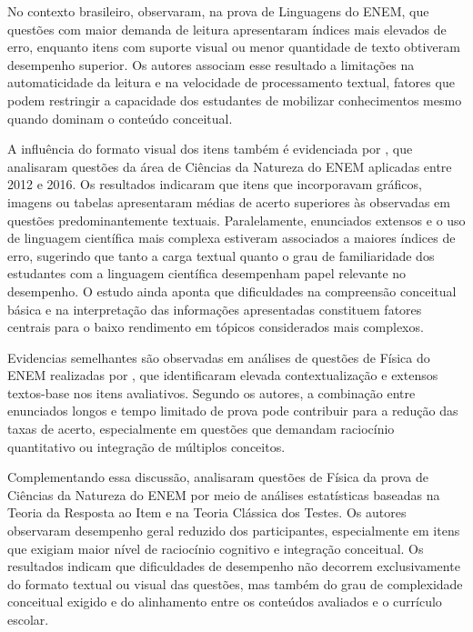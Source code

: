 \documentclass[a4paper,10pt, twocolumn]{article}
\begin{document}
No contexto brasileiro, \textcite{silva2019desempenho} observaram, na prova de Linguagens do ENEM, que questões com maior demanda de leitura apresentaram índices mais elevados de erro, enquanto itens com suporte visual ou menor quantidade de texto obtiveram desempenho superior. Os autores associam esse resultado a limitações na automaticidade da leitura e na velocidade de processamento textual, fatores que podem restringir a capacidade dos estudantes de mobilizar conhecimentos mesmo quando dominam o conteúdo conceitual.

A influência do formato visual dos itens também é evidenciada por \textcite{Cestaro2020}, que analisaram questões da área de Ciências da Natureza do ENEM aplicadas entre 2012 e 2016. Os resultados indicaram que itens que incorporavam gráficos, imagens ou tabelas apresentaram médias de acerto superiores às observadas em questões predominantemente textuais. Paralelamente, enunciados extensos e o uso de linguagem científica mais complexa estiveram associados a maiores índices de erro, sugerindo que tanto a carga textual quanto o grau de familiaridade dos estudantes com a linguagem científica desempenham papel relevante no desempenho. O estudo ainda aponta que dificuldades na compreensão conceitual básica e na interpretação das informações apresentadas constituem fatores centrais para o baixo rendimento em tópicos considerados mais complexos.

Evidencias semelhantes são observadas em análises de questões de Física do ENEM realizadas por \textcite{goncalves2014questoes}, que identificaram elevada contextualização e extensos textos-base nos itens avaliativos. Segundo os autores, a combinação entre enunciados longos e tempo limitado de prova pode contribuir para a redução das taxas de acerto, especialmente em questões que demandam raciocínio quantitativo ou integração de múltiplos conceitos.

Complementando essa discussão, \textcite{lopes2015estudo} analisaram questões de Física da prova de Ciências da Natureza do ENEM por meio de análises estatísticas baseadas na Teoria da Resposta ao Item e na Teoria Clássica dos Testes. Os autores observaram desempenho geral reduzido dos participantes, especialmente em itens que exigiam maior nível de raciocínio cognitivo e integração conceitual. Os resultados indicam que dificuldades de desempenho não decorrem exclusivamente do formato textual ou visual das questões, mas também do grau de complexidade conceitual exigido e do alinhamento entre os conteúdos avaliados e o currículo escolar.
\end{document}
